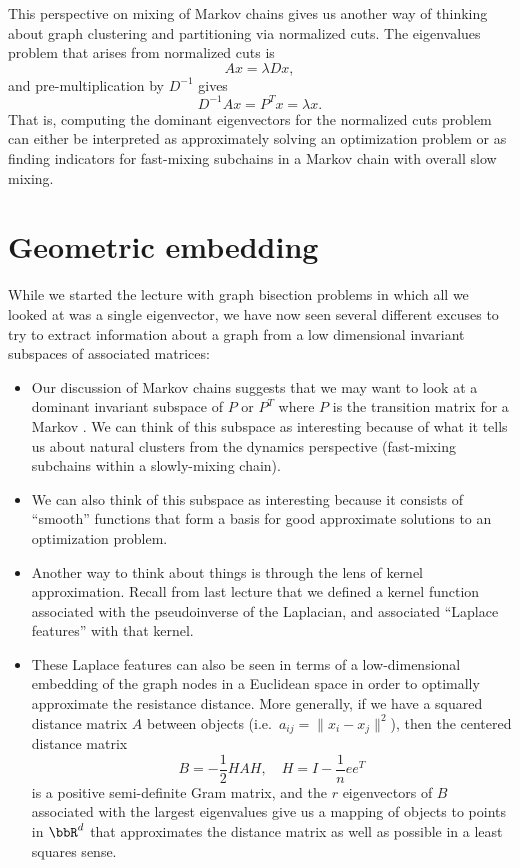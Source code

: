 \documentclass[12pt, leqno]{article} %
\begin{document}
This perspective on mixing of Markov chains gives us another way of
thinking about graph clustering and partitioning via normalized cuts.
The eigenvalues problem that arises from normalized cuts is
\[
  Ax = \lambda D x,
\]
and pre-multiplication by $D^{-1}$ gives
\[
  D^{-1} A x = P^T x = \lambda x.
\]
That is, computing the dominant eigenvectors for the normalized cuts
problem can either be interpreted as approximately solving an
optimization problem or as finding indicators for fast-mixing
subchains in a Markov chain with overall slow mixing.

\section{Geometric embedding}

While we started the lecture with graph bisection problems in which
all we looked at was a single eigenvector, we have now seen several
different excuses to try to extract information about a graph
from a low dimensional invariant subspaces of associated matrices:
\begin{itemize}
\item
  Our discussion of Markov chains suggests
  that we may want to look at a dominant invariant subspace of $P$ or
  $P^T$ where $P$ is the transition matrix for a Markov .  We can
  think of this subspace as interesting because of what it tells us
  about natural clusters from the dynamics perspective (fast-mixing
  subchains within a slowly-mixing chain).
\item
  We can also think of this subspace as interesting because it
  consists of ``smooth'' functions that form a basis for good
  approximate solutions to an optimization problem.
\item
  Another way to think about things is through the lens of kernel
  approximation.  Recall from last lecture that we defined a kernel
  function associated with the pseudoinverse of the Laplacian, and
  associated ``Laplace features'' with that kernel.
\item
  These Laplace features can also be seen in terms of a low-dimensional
  embedding of the graph nodes in a Euclidean space in order to
  optimally approximate the resistance distance.  More generally, if
  we have a squared distance matrix $A$ between objects
  (i.e.~$a_{ij} = \|x_i-x_j\|^2$), then the centered distance matrix
  \[
    B = -\frac{1}{2} H A H, \quad H = I-\frac{1}{n} ee^T
  \]
  is a positive semi-definite Gram matrix, and the $r$
  eigenvectors of $B$ associated with the largest eigenvalues
  give us a mapping of objects to points in $\bbR^d$ that
  approximates the distance matrix as well as possible in a least
  squares sense.
\end{itemize}
\end{document}

